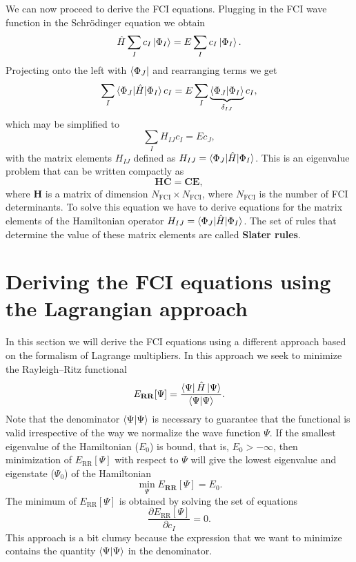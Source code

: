 \documentclass[../Main/chem532-notes.tex]{subfiles}
\begin{document}
We can now proceed to derive the FCI equations.
Plugging in the FCI wave function in the Schr\"{o}dinger equation we obtain
\begin{equation}
\hat{H} \sum_I c_I \ket{\Phi_I} = E \sum_I c_I \ket{\Phi_I}.
\end{equation}
Projecting onto the left with $\bra{\Phi_J}$ and rearranging terms we get
\begin{equation}
 \sum_I \braket{\Phi_J |\hat{H} | \Phi_I} c_I = E \sum_I \underbrace{\braket{\Phi_J | \Phi_I}}_{\delta_{IJ}} c_I,
\end{equation}
which may be simplified to 
\begin{equation}
 \sum_I H_{IJ} c_I = E c_J,
\end{equation}
with the matrix elements $H_{IJ}$ defined as $H_{IJ} = \braket{\Phi_J |\hat{H} | \Phi_I}$.
This is an eigenvalue problem that can be written compactly as
\begin{equation}
\mathbf{H}\mathbf{C} = \mathbf{C} \mathbf{E},
\end{equation}
where $\mathbf{H}$ is a matrix of dimension $N_{\mathrm{FCI}} \times N_{\mathrm{FCI}}$, where $N_{\mathrm{FCI}}$ is the number of FCI determinants.
To solve this equation we have to derive equations for the matrix elements of the Hamiltonian operator $H_{IJ} = \braket{\Phi_J |\hat{H} | \Phi_I}$. The set of rules that determine the value of these matrix elements are called \textbf{Slater rules}.

\section{Deriving the FCI equations using the Lagrangian approach}
In this section we will derive the FCI equations using a different approach based on the formalism of Lagrange multipliers.
In this approach we seek to minimize the Rayleigh--Ritz functional
\begin{equation}
E_\mathbf{RR}[\Psi] = \frac{\bra{\Psi} \hat{H} \ket{\Psi}}{\braket{\Psi|\Psi}}.
\end{equation}
Note that the denominator $\braket{\Psi|\Psi}$ is necessary to guarantee that the functional is valid irrespective of the way we normalize the wave function $\Psi$.
If the smallest eigenvalue of the Hamiltonian ($E_0$) is bound, that is, $E_0 > - \infty$, then minimization of $E_\mathrm{RR}[\Psi]$ with respect to $\Psi$ will give the lowest eigenvalue and eigenstate ($\Psi_0$) of the Hamiltonian 
\begin{equation}
\min_{\Psi} E_\mathbf{RR}[\Psi] = E_0.
\end{equation}
The minimum of $E_\mathrm{RR}[\Psi]$ is obtained by solving the set of equations
\begin{equation}
\frac{\partial E_\mathrm{RR}[\Psi]}{\partial c_I} = 0.
\end{equation}
This approach is a bit clumsy because the expression that we want to minimize contains the quantity $\braket{\Psi|\Psi}$ in the denominator.
\end{document}
